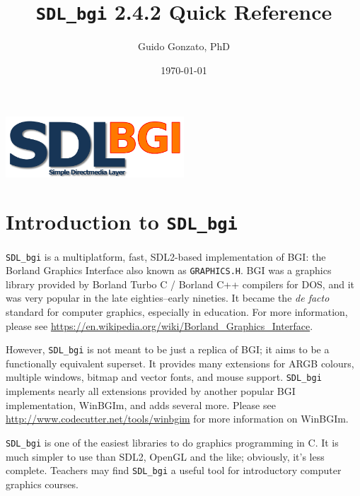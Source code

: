 \documentclass[a4paper,12pt]{article}
\newcommand{\SDLbgi}{\texttt{SDL\_bgi}}
\newcommand{\version}{2.4.2}        %
\begin{document}
\title{\SDLbgi{} \version{} Quick Reference}

\author{Guido Gonzato, PhD}

\date{\today}

\maketitle

\begin{center}
  \includegraphics[width=0.5\textwidth]{SDL_bgi_logo.png}
\end{center}

{\small \tableofcontents}


\section{Introduction to \SDLbgi}

\SDLbgi{} is a multiplatform, fast, SDL2-based implementation of BGI:
the Borland Graphics Interface also known as \texttt{GRAPHICS.H}. BGI
was a graphics library provided by Borland Turbo C / Borland C++
compilers for DOS, and it was very popular in the late eighties--early
nineties. It became the \emph{de facto} standard for computer
graphics, especially in education. For more information, please see 
\url{https://en.wikipedia.org/wiki/Borland_Graphics_Interface}.


However, \SDLbgi{} is not meant to be just a replica of BGI; it aims
to be a functionally equivalent superset. It provides many extensions
for ARGB colours, multiple windows, bitmap and vector fonts, and mouse
support. \SDLbgi{} implements nearly all extensions provided by
another popular BGI implementation, WinBGIm, and adds several more.
Please see \url{http://www.codecutter.net/tools/winbgim} for more
information on WinBGIm.

\SDLbgi{} is one of the easiest libraries to do graphics programming
in C. It is much simpler to use than SDL2, OpenGL and the like;
obviously, it's less complete. Teachers may find \SDLbgi{} a useful
tool for introductory computer graphics courses.
\end{document}
